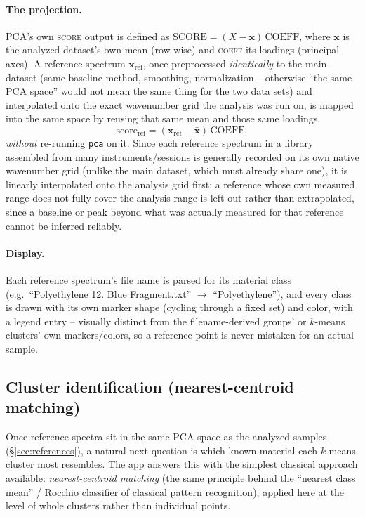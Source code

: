 \documentclass[11pt,a4paper]{article}
\newcommand{\code}[1]{\texttt{#1}}
\begin{document}
\paragraph{The projection.} PCA's own \textsc{score} output is defined as
$\text{SCORE} = (X - \bar{\mathbf{x}})\,\text{COEFF}$, where $\bar{\mathbf x}$
is the analyzed dataset's own mean (row-wise) and \textsc{coeff} its
loadings (principal axes). A reference spectrum $\mathbf{x}_{\text{ref}}$,
once preprocessed \emph{identically} to the main dataset (same baseline
method, smoothing, normalization -- otherwise ``the same PCA space'' would
not mean the same thing for the two data sets) and interpolated onto the
exact wavenumber grid the analysis was run on, is mapped into the same
space by reusing that same mean and those same loadings,
\[
  \text{score}_{\text{ref}} = (\mathbf{x}_{\text{ref}} - \bar{\mathbf{x}})\,\text{COEFF} ,
\]
\emph{without} re-running \code{pca} on it. Since each reference spectrum
in a library assembled from many instruments/sessions is generally
recorded on its own native wavenumber grid (unlike the main dataset, which
must already share one), it is linearly interpolated onto the analysis
grid first; a reference whose own measured range does not fully cover the
analysis range is left out rather than extrapolated, since a baseline or
peak beyond what was actually measured for that reference cannot be
inferred reliably.

\paragraph{Display.} Each reference spectrum's file name is parsed for its
material class (e.g.\ ``Polyethylene 12. Blue Fragment.txt'' $\to$
``Polyethylene''), and every class is drawn with its own marker shape
(cycling through a fixed set) and color, with a legend entry -- visually
distinct from the filename-derived groups' or $k$-means clusters' own
markers/colors, so a reference point is never mistaken for an actual
sample.

\subsection{Cluster identification (nearest-centroid matching)}
\label{sec:identification}
Once reference spectra sit in the same PCA space as the analyzed samples
(\S\ref{sec:references}), a natural next question is which known material
each $k$-means cluster most resembles. The app answers this with the
simplest classical approach available: \emph{nearest-centroid matching}
(the same principle behind the ``nearest class mean'' / Rocchio
classifier of classical pattern recognition), applied here at the level
of whole clusters rather than individual points.
\end{document}
